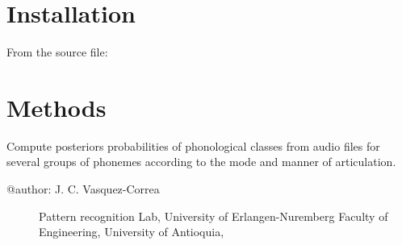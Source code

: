 \documentclass[letterpaper,10pt,english]{sphinxmanual}
\begin{document}
\chapter{Installation}
\label{\detokenize{index:installation}}
From the source file:

\begin{sphinxVerbatim}[commandchars=\\\{\}]
  
 
  
\end{sphinxVerbatim}


\chapter{Methods}
\label{\detokenize{index:methods}}\label{\detokenize{index:module-phonet}}
Compute posteriors probabilities of phonological classes from audio files for several groups of phonemes according to the mode and manner of articulation.
\begin{description}
\item[{@author: J. C. Vasquez-Correa}] \leavevmode
Pattern recognition Lab, University of Erlangen-Nuremberg
Faculty of Engineering, University of Antioquia,

\end{description}
\end{document}
